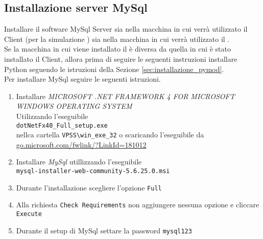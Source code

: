 \documentclass[a4paper,twoside,10pt,openany]{scrbook}
\begin{document}
\subsection{Installazione server MySql}\label{sec:installazione_mysql}
%
Installare il software MySql Server sia nella macchina in cui verrà utilizzato il Client (per la simulazione \auth) sia nella macchina in cui verrà utilizzato il \sr.\\
Se la macchina in cui viene installato il \sr è diversa da quella in cui è stato installato il Client, allora prima di seguire le seguenti instruzioni installare Python seguendo le istruzioni della Sezione \ref{sec:installazione_pymod}.\\
Per installare MySql seguire le seguenti istruzioni.
\begin{enumerate}
 \item Installare \emph{MICROSOFT .NET FRAMEWORK 4 FOR MICROSOFT WINDOWS OPERATING SYSTEM}\\
       Utilizzando l'eseguibile\\
       \texttt{dotNetFx40\_Full\_setup.exe}\\
       nellca cartella  \texttt{VPSS\textbackslash win\_exe\_32} o scaricando l'eseguibile da\\
       \url{go.microsoft.com/fwlink/?LinkId=181012}
 \item Installare \emph{MySql} utillizzando l'eseguibile\\
       \texttt{mysql-installer-web-community-5.6.25.0.msi}
 \item Durante l'installazione scegliere l'opzione \texttt{Full}
 \item Alla richiesta \texttt{Check Requirements} non aggiungere nessuna opzione e cliccare \texttt{Execute}
 \item Durante il setup di MySql settare la password \texttt{mysql123}
\end{enumerate}

%
\end{document}
